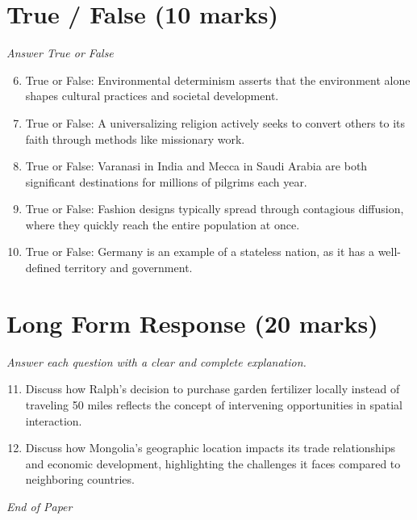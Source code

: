 \documentclass[12pt]{article}
\begin{document}
\section*{True / False (10 marks)}
\textit{Answer True or False}
\begin{enumerate}[label=\arabic*.]
\setcounter{enumi}{5}
\item True or False: Environmental determinism asserts that the environment alone shapes cultural practices and societal development.
\item True or False: A universalizing religion actively seeks to convert others to its faith through methods like missionary work.
\item True or False: Varanasi in India and Mecca in Saudi Arabia are both significant destinations for millions of pilgrims each year.
\item True or False: Fashion designs typically spread through contagious diffusion, where they quickly reach the entire population at once.
\item True or False: Germany is an example of a stateless nation, as it has a well-defined territory and government.
\end{enumerate}

\section*{Long Form Response (20 marks)}
\textit{Answer each question with a clear and complete explanation.}
\begin{enumerate}[label=\arabic*.]
\setcounter{enumi}{10}
\item Discuss how Ralph's decision to purchase garden fertilizer locally instead of traveling 50 miles reflects the concept of intervening opportunities in spatial interaction.
\item Discuss how Mongolia's geographic location impacts its trade relationships and economic development, highlighting the challenges it faces compared to neighboring countries.
\end{enumerate}

\vfill
\noindent\textit{End of Paper}
\end{document}
